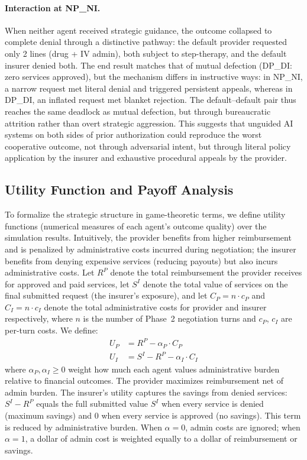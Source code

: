 \paragraph{Interaction at NP\_NI.}
When neither agent received strategic guidance, the outcome collapsed to complete denial through a distinctive pathway: the default provider requested only 2 lines (drug + IV admin), both subject to step-therapy, and the default insurer denied both. The end result matches that of mutual defection (DP\_DI: zero services approved), but the mechanism differs in instructive ways: in NP\_NI, a narrow request met literal denial and triggered persistent appeals, whereas in DP\_DI, an inflated request met blanket rejection. The default--default pair thus reaches the same deadlock as mutual defection, but through bureaucratic attrition rather than overt strategic aggression. This suggests that unguided AI systems on both sides of prior authorization could reproduce the worst cooperative outcome, not through adversarial intent, but through literal policy application by the insurer and exhaustive procedural appeals by the provider.

\subsection{Utility Function and Payoff Analysis}
\label{sec:payoff}

To formalize the strategic structure in game-theoretic terms, we define utility functions (numerical measures of each agent's outcome quality) over the simulation results. Intuitively, the provider benefits from higher reimbursement and is penalized by administrative costs incurred during negotiation; the insurer benefits from denying expensive services (reducing payouts) but also incurs administrative costs. Let $R^P$ denote the total reimbursement the provider receives for approved and paid services, let $S^I$ denote the total value of services on the final submitted request (the insurer's exposure), and let $C_P = n \cdot c_P$ and $C_I = n \cdot c_I$ denote the total administrative costs for provider and insurer respectively, where $n$ is the number of Phase~2 negotiation turns and $c_P$, $c_I$ are per-turn costs. We define:
\begin{align}
    U_P &= R^P - \alpha_P \cdot C_P \label{eq:u_provider} \\
    U_I &= S^I - R^P - \alpha_I \cdot C_I \label{eq:u_insurer}
\end{align}
where $\alpha_P, \alpha_I \geq 0$ weight how much each agent values administrative burden relative to financial outcomes. The provider maximizes reimbursement net of admin burden. The insurer's utility captures the savings from denied services: $S^I - R^P$ equals the full submitted value $S^I$ when every service is denied (maximum savings) and $0$ when every service is approved (no savings). This term is reduced by administrative burden. When $\alpha = 0$, admin costs are ignored; when $\alpha = 1$, a dollar of admin cost is weighted equally to a dollar of reimbursement or savings.

